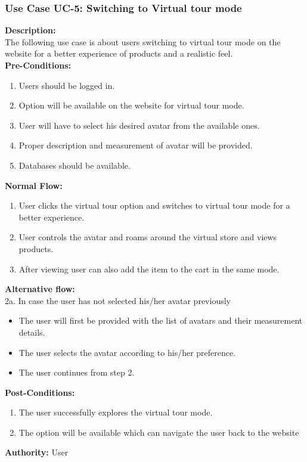 \subsubsection{Use Case UC-5: Switching to Virtual tour mode }
\textbf{Description:}\\
The following use case is about users switching to virtual tour mode on the website for a better experience of products and a realistic feel. 
\\
\textbf{Pre-Conditions:}
\begin{enumerate}
 \item Users should be logged in. 
\item Option will be available on the website for virtual tour mode.
\item User will have to select his desired avatar from the available ones.
\item Proper description and measurement of avatar will be provided. 
\item Databases should be available. 
\end{enumerate}
\textbf{Normal Flow:}\\
\begin{enumerate}
\item User clicks the virtual tour option and switches to virtual tour mode for a better experience. 
\item User controls the avatar and roams around the virtual store and views products. 
\item After viewing user can also add the item to the cart in the same mode. 
\end{enumerate}
\textbf{Alternative flow:}\\ 
2a. In case the user has not selected his/her avatar previously
\begin{itemize}
    \item The user will first be provided with the list of avatars and their measurement details.
     \item The user selects the avatar according to his/her preference.
     \item The user continues from step 2. 
 \end{itemize}
\textbf{Post-Conditions: }
\begin{enumerate}
\item	The user successfully explores the virtual tour mode.
\item	The option will be available which can navigate the user back to the website
\end{enumerate}
\textbf{Authority:}
User
